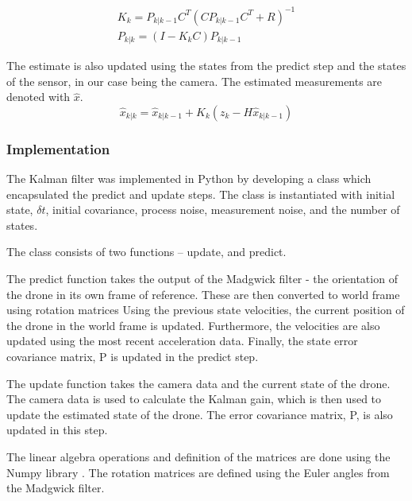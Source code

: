 \documentclass[bare_jrnl_transmag]{subfiles}
\begin{document}
\begin{eqnarray*}
    K_k = P_{k|k-1} C^T (C P_{k|k-1} C^T + R)^{-1} \\[1em]
    P_{k|k} = (I - K_k C) P_{k|k-1}
\end{eqnarray*}

The estimate is also updated using the states from the predict step and the states of the sensor, in our case being the camera. 
The estimated measurements are denoted with $\hat{x}$. 
\begin{equation*}
    \hat{x}_{k|k} = \hat{x}_{k|k-1} + K_k (z_k - H \hat{x}_{k|k-1})
\end{equation*}
\newline

\subsubsection{Implementation}

The Kalman filter was implemented in Python by developing a class which encapsulated the predict and update steps. The class is instantiated with initial state, $\delta t$, initial covariance, process noise, measurement noise, and the number of states. 

The class consists of two functions -- update, and predict.\newline

The predict function takes the output of the Madgwick filter - the orientation of the drone in its own frame of reference. These are then converted to world frame using rotation matrices Using the previous state velocities, the current position of the drone in the world frame is updated. Furthermore, the velocities are also updated using the most recent acceleration data. Finally, the state error covariance matrix, P is updated in the predict step. \newline

The update function takes the camera data and the current state of the drone. The camera data is used to calculate the Kalman gain, which is then used to update the estimated state of the drone. The error covariance matrix, P, is also updated in this step.\newline

The linear algebra operations and definition of the matrices are done using the Numpy library \cite{numpy}. The rotation matrices are defined using the Euler angles from the Madgwick filter. 
\end{document}
